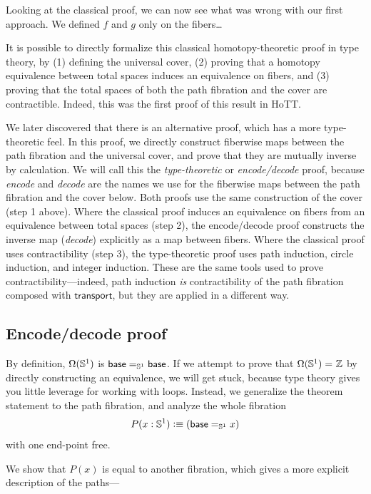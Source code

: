 Looking at the classical proof, we can now see what was wrong with our first approach.
We defined $f$ and $g$ only on the fibers\dots



\smallskip

It is possible to directly formalize this classical homotopy-theoretic
proof in type theory, by (1) defining the universal cover, (2) proving
that a homotopy equivalence between total spaces induces an equivalence
on fibers, and (3) proving that the total spaces of both the path
fibration and the cover are contractible. Indeed, this was the first
proof of this result in HoTT.

We later discovered that there is an alternative proof, which has a more
type-theoretic feel.  In this proof, we directly construct fiberwise
maps between the path fibration and the universal cover, and prove that
they are mutually inverse by calculation.  We will call this the
\emph{type-theoretic} or \emph{encode/decode} proof, because
\emph{encode} and \emph{decode} are the names we use for the fiberwise
maps between the path fibration and the cover below.  Both proofs use
the same construction of the cover (step 1 above).  Where the classical
proof induces an equivalence on fibers from an equivalence between total
spaces (step 2), the encode/decode proof constructs the inverse map
(\emph{decode}) explicitly as a map between fibers.  Where the classical
proof uses contractibility (step 3), the type-theoretic proof uses path
induction, circle induction, and integer induction.  These are the same
tools used to prove contractibility---indeed, path induction \emph{is}
contractibility of the path fibration composed with
$\mathsf{transport}$, but they are applied in a different way.

\subsection{Encode/decode proof}

By definition, $\Omega(\Sn ^1)$ is $\id[\Sn ^1] \base \base$.  If we
attempt to prove that $\id {\Omega(\Sn ^1)} {\Z}$ by directly
constructing an equivalence, we will get stuck, because type theory
gives you little leverage for working with loops.  Instead, we
generalize the theorem statement to the path fibration, and analyze the
whole fibration
\[
P(x:\Sn ^1) \defeq (\id[\Sn ^1] \base x)
\]
with one end-point free.  

We show that $P(x)$ is equal to another fibration, which gives a more
explicit description of the paths---


